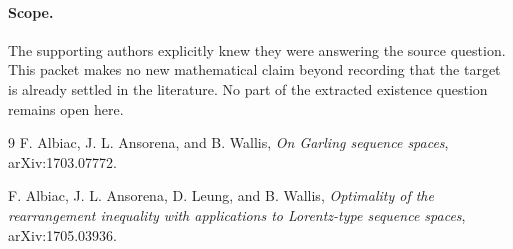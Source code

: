 \documentclass[11pt]{article}
\begin{document}
\paragraph{Scope.}
The supporting authors explicitly knew they were answering the source question.
This packet makes no new mathematical claim beyond recording that the target is
already settled in the literature.  No part of the extracted existence question
remains open here.

\begin{thebibliography}{9}
F. Albiac, J. L. Ansorena, and B. Wallis,
\emph{On Garling sequence spaces}, arXiv:1703.07772.

F. Albiac, J. L. Ansorena, D. Leung, and B. Wallis,
\emph{Optimality of the rearrangement inequality with applications to
Lorentz-type sequence spaces}, arXiv:1705.03936.
\end{thebibliography}
\end{document}
